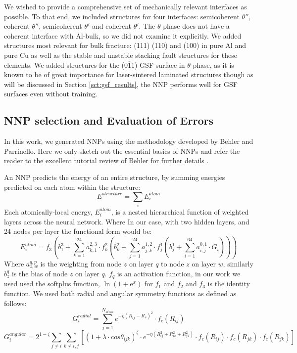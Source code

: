 \documentclass{article}
\begin{document}
We wished to provide a comprehensive set of mechanically relevant interfaces as possible. 
To that end, we included structures for four interfaces: semicoherent $\theta''$, coherent $\theta''$,
semicoherent $\theta'$ and coherent $\theta'$. The $\theta$ phase does not have a coherent interface\cite{Nie2014PhysicalAlloys} with Al-bulk, so we did not examine it explicitly. 
We added structures most relevant for bulk fracture: (111) (110) and (100) in pure Al and pure Cu as well as
the stable and unstable stacking fault structures for these elements.
We added structures for the (0$\overline{1}$1) GSF surface in $\theta$ phase, as it is known to be of
great importance for laser-sintered laminated structures\cite{Wang2018} though as will be discussed in Section \ref{sct:gsf_results}, the NNP performs well for GSF surfaces even without training. 

\subsection{NNP selection and Evaluation of Errors}
In this work, we generated NNPs using the methodology developed by Behler and Parrinello\cite{Behler2007}.
Here we only sketch out the essential basics of NNPs and refer the reader to the excellent tutorial review of Behler for further details \cite{Behler2015}. 


An NNP predicts the energy of an entire structure, by summing energies predicted on each atom within the structure: 
\begin{equation}
E^{structure} = \sum_i E^{atom}_i
\end{equation}
Each atomically-local energy, $E^{atom}_i$, is a nested hierarchical function of weighted layers across the neural network.
Where In our case, with two hidden layers, and 24 nodes per layer the functional form would be:
\begin{equation}
E^{atom}_i = f_3 ( b^3_1+\sum^{24}_{k=1}a^{2,3}_{k,1}\cdot f^2_k(b^2_k+\sum^{24}_{j=1}a^{1,2}_{j,k}\cdot f^1_j ( b^1_j + \sum^{64}_{i=1} a^{0,1}_{i,j}\cdot G_i  ))) 
\end{equation}
Where $a^{q,p}_{z,w}$ is the weighting from node $z$ on layer $q$ to node $z$ on layer $w$, similarly $b^q_z$ is
the bias of node $z$ on layer $q$. $f_q$ is an activation function, in our work we used used the softplus function,
$\ln (1 + \mathrm{e}^x)$ for $f_1$ and $f_2$ and $f_3$ is the identity function. 
We used both radial and angular symmetry functions as  defined as follows:
\begin{equation}
G^{radial}_i = \sum^{N_{atom}}_{j=1}e^{-\eta(R_{ij}-R_{s})^2}\cdot f_c(R_{ij})
\end{equation}
\begin{equation}
G^{angular}_i = 2^{1-\zeta}\sum_{j\neq i}\sum_{k\neq i,j}[ (1+\lambda\cdot cos\theta_{ijk})^\zeta \cdot e^{-\eta(R^2_{ij}+R^2_{ik}+R^2_{jk})}\cdot f_c(R_{ij}) \cdot f_c(R_{jk}) \cdot f_c(R_{jk}) ]
\end{equation}
\end{document}
